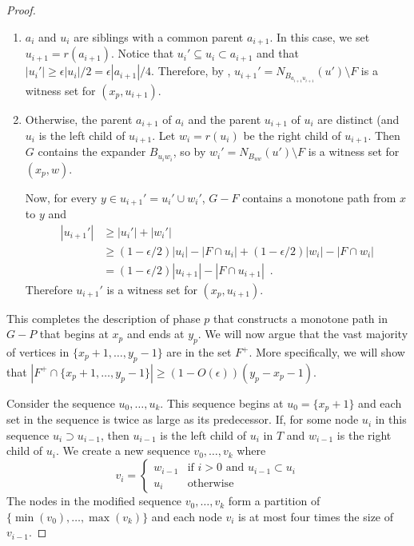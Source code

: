 \documentclass{patmorin}
\begin{document}
\begin{proof}
\begin{enumerate}
    \item $a_i$ and $u_i$ are siblings with a common
    parent $a_{i+1}$.  In this case, we set $u_{i+1}=r(a_{i+1})$.
    Notice that $u_i'\subseteq u_{i}\subset a_{i+1}$ and that
    $|u_i'|\ge \epsilon|u_i|/2 = \epsilon|a_{i+1}|/4$.  Therefore, by
    , $u_{i+1}'= N_{B_{a_{i+1}u_{i+1}}}(u')\setminus F$
    is a witness set for $(x_p,u_{i+1})$.

   \item Otherwise, the parent $a_{i+1}$ of $a_i$ and the parent
   $u_{i+1}$ of $u_i$ are distinct (and $u_i$ is the left child
   of $u_{i+1}$.  Let $w_i=r(u_i)$ be the right child of $u_{i+1}$.
   Then $G$ contains the expander $B_{u_iw_i}$, so by 
   $w_i'=N_{B_{uw}}(u')\setminus F$ is a witness set for $(x_p,w)$.

   Now, for every $y\in u_{i+1}'=u_i'\cup w_i'$, $G-F$ contains a monotone
   path from $x$ to $y$ and
   \begin{align*}
	   |u_{i+1}'| 
	   & \ge |u_i'|+|w_i'| \\
	   & \ge (1-\epsilon/2)|u_{i}| - |F\cap u_i| + (1-\epsilon/2)|w_i| - |F\cap w_i| \\
	   &= (1-\epsilon/2)|u_{i+1}| - |F\cap u_{i+1}|  \enspace .
   \end{align*}
  Therefore $u_{i+1}'$ is a witness set for $(x_p,u_{i+1})$.
  \end{enumerate}

  This completes the description of phase $p$ that constructs a
  monotone path in $G-P$ that begins at $x_p$
  and ends at $y_p$.  We will now argue that the vast majority of
  vertices in $\{x_p+1,\ldots,y_p-1\}$ are in the set $F^+$.  More
  specifically, we will show that $|F^+\cap\{x_p+1,\ldots,y_p-1\}| \ge
  (1-O(\epsilon))(y_p-x_p-1)$.

  Consider the sequence $u_0,\ldots,u_k$.  This sequence begins at
  $u_0=\{x_p+1\}$ and each set in the sequence is twice as large as its
  predecessor.   If, for some node $u_i$ in this sequence $u_i\supset
  u_{i-1}$, then $u_{i-1}$ is the left child of $u_i$ in $T$ and
  $w_{i-1}$ is the right child of $u_i$.    We create a new sequence
  $v_0,\ldots,v_k$ where
  \[
    v_i = \begin{cases} 
	    w_{i-1} & \text{if $i>0$ and $u_{i-1}\subset u_i$} \\
	    u_i & \text{otherwise}
    \end{cases}
  \]
  The nodes in the modified sequence $v_0,\ldots,v_k$ form a partition
  of $\{\min(v_0),\ldots,\max(v_k)\}$ and each node $v_i$ is at most
  four times the size of $v_{i-1}$.


\end{proof}
\end{document}
